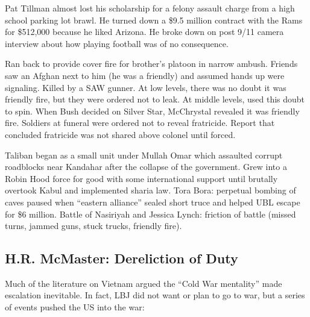 \documentclass[
]{article}
\begin{document}
Pat Tillman almost lost his scholarship for a felony assault charge from
a high school parking lot brawl. He turned down a \$9.5 million contract
with the Rams for \$512,000 because he liked Arizona. He broke down on
post 9/11 camera interview about how playing football was of no
consequence.

Ran back to provide cover fire for brother's platoon in narrow ambush.
Friends saw an Afghan next to him (he was a friendly) and assumed hands
up were signaling. Killed by a SAW gunner. At low levels, there was no
doubt it was friendly fire, but they were ordered not to leak. At middle
levels, used this doubt to spin. When Bush decided on Silver Star,
McChrystal revealed it was friendly fire. Soldiers at funeral were
ordered not to reveal fratricide. Report that concluded fratricide was
not shared above colonel until forced.

Taliban began as a small unit under Mullah Omar which assaulted corrupt
roadblocks near Kandahar after the collapse of the government. Grew into
a Robin Hood force for good with some international support until
brutally overtook Kabul and implemented sharia law. Tora Bora: perpetual
bombing of caves paused when ``eastern alliance'' sealed short truce and
helped UBL escape for \$6 million. Battle of Nasiriyah and Jessica
Lynch: friction of battle (missed turns, jammed guns, stuck trucks,
friendly fire).

\hypertarget{h.r.-mcmaster-dereliction-of-duty}{%
\subsection{H.R. McMaster: Dereliction of
Duty}\label{h.r.-mcmaster-dereliction-of-duty}}

Much of the literature on Vietnam argued the ``Cold War mentality'' made
escalation inevitable. In fact, LBJ did not want or plan to go to war,
but a series of events pushed the US into the war:
\end{document}
